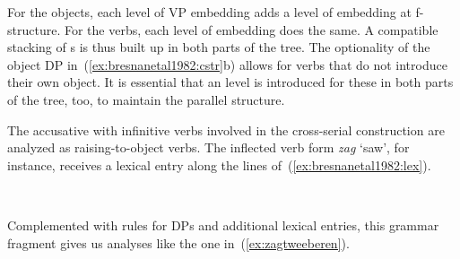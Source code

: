 \documentclass[output=paper,hidelinks]{langscibook}
\begin{document}
\pagebreak 
\begin{exe}
\ex\label{ex:bresnanetal1982:cstr}\begin{xlist}
  \ex {}
  \ex {}
  \ex {}
  \end{xlist}
\end{exe}
%
For the objects, each level of VP embedding adds a level of \XCOMP
embedding at f-structure. For the verbs, each level of 
embedding does the same. A compatible stacking of \XCOMP{}s is thus
built up in both parts of the tree. The optionality of the object DP
in~(\ref{ex:bresnanetal1982:cstr}b) allows for verbs that do not introduce their own
object. It is essential that an \XCOMP{} level is introduced for these
in both parts of the tree, too, to maintain the parallel structure.

The accusative with infinitive verbs involved in the cross-serial
construction are analyzed as raising-to-object verbs. The inflected
verb form \textit{zag} `saw', for instance, receives a lexical entry
along the lines of~(\ref{ex:bresnanetal1982:lex}).
%
\begin{exe}
  \ex\label{ex:bresnanetal1982:lex} \\
\end{exe}
%
Complemented with rules for DPs and additional lexical entries, this
grammar fragment gives us analyses like the one
in~(\ref{ex:zagtweeberen}). 
%
\end{document}
